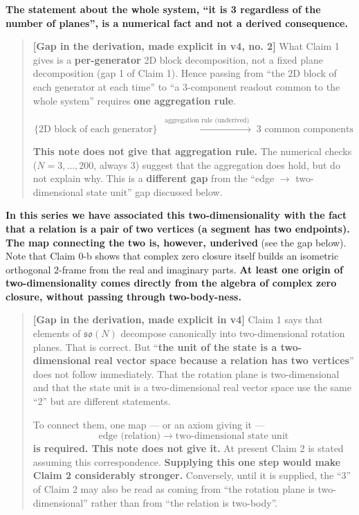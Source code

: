 \documentclass[
  10pt,
]{article}
\begin{document}
\textbf{The statement about the whole system, ``it is 3 regardless of
the number of planes'', is a numerical fact and not a derived
consequence.}

\begin{quote}
\textbf{{[}Gap in the derivation, made explicit in v4, no. 2{]}} What
Claim 1 gives is a \textbf{per-generator} 2D block decomposition, not a
fixed plane decomposition (gap 1 of Claim 1). Hence passing from ``the
2D block of each generator at each time'' to ``a 3-component readout
common to the whole system'' requires \textbf{one aggregation rule}.

\[\{\text{2D block of each generator}\} \;\xrightarrow{\;\text{aggregation rule (underived)}\;}\; \text{3 common components}\]

\textbf{This note does not give that aggregation rule.} The numerical
checks (\(N = 3,\dots,200\), always 3) suggest that the aggregation does
hold, but do not explain why. This is a \textbf{different gap} from the
``edge \(\to\) two-dimensional state unit'' gap discussed below.
\end{quote}

\textbf{In this series we have associated this two-dimensionality with
the fact that a relation is a pair of two vertices (a segment has two
endpoints). The map connecting the two is, however, underived} (see the
gap below). Note that Claim 0-b shows that complex zero closure itself
builds an isometric orthogonal 2-frame from the real and imaginary
parts. \textbf{At least one origin of two-dimensionality comes directly
from the algebra of complex zero closure, without passing through
two-body-ness.}

\begin{quote}
\textbf{{[}Gap in the derivation, made explicit in v4{]}} Claim 1 says
that elements of \(\mathfrak{so}(N)\) decompose canonically into
two-dimensional rotation planes. That is correct. But ``\textbf{the unit
of the state is a two-dimensional real vector space because a relation
has two vertices}'' does not follow immediately. That the rotation plane
is two-dimensional and that the state unit is a two-dimensional real
vector space use the same ``2'' but are different statements.

To connect them, one map --- or an axiom giving it ---
\[\text{edge (relation)} \;\longrightarrow\; \text{two-dimensional state unit}\]
\textbf{is required. This note does not give it.} At present Claim 2 is
stated assuming this correspondence. \textbf{Supplying this one step
would make Claim 2 considerably stronger.} Conversely, until it is
supplied, the ``3'' of Claim 2 may also be read as coming from ``the
rotation plane is two-dimensional'' rather than from ``the relation is
two-body''.
\end{quote}
\end{document}

